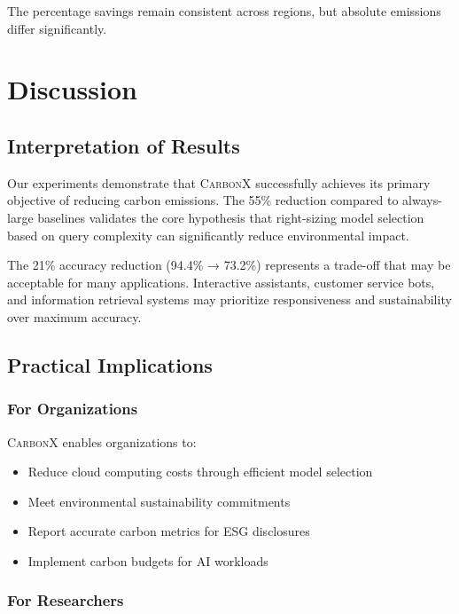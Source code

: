 \documentclass[conference]{IEEEtran}
\newcommand{\carbonx}{\textsc{CarbonX}}
\begin{document}
The percentage savings remain consistent across regions, but absolute emissions differ significantly.

\section{Discussion}

\subsection{Interpretation of Results}

Our experiments demonstrate that \carbonx{} successfully achieves its primary objective of reducing carbon emissions. The 55\% reduction compared to always-large baselines validates the core hypothesis that right-sizing model selection based on query complexity can significantly reduce environmental impact.

The 21\% accuracy reduction (94.4\% → 73.2\%) represents a trade-off that may be acceptable for many applications. Interactive assistants, customer service bots, and information retrieval systems may prioritize responsiveness and sustainability over maximum accuracy.

\subsection{Practical Implications}

\subsubsection{For Organizations}

\carbonx{} enables organizations to:
\begin{itemize}
    \item Reduce cloud computing costs through efficient model selection
    \item Meet environmental sustainability commitments
    \item Report accurate carbon metrics for ESG disclosures
    \item Implement carbon budgets for AI workloads
\end{itemize}

\subsubsection{For Researchers}
\end{document}
